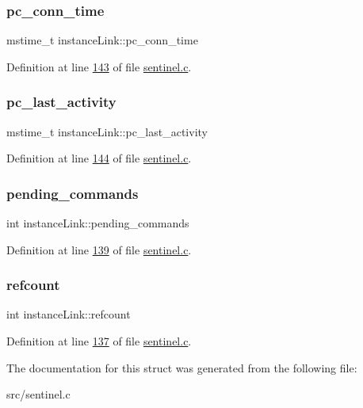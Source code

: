 \subsubsection{\texorpdfstring{pc\+\_\+conn\+\_\+time}{pc\_conn\_time}}
{\footnotesize\ttfamily mstime\+\_\+t instance\+Link\+::pc\+\_\+conn\+\_\+time}



Definition at line \hyperlink{sentinel_8c_source_l00143}{143} of file \hyperlink{sentinel_8c_source}{sentinel.\+c}.

\mbox{\label{structinstanceLink_aa259c3baa9b28cf7d9acee9b72eb825a}} 
\subsubsection{\texorpdfstring{pc\+\_\+last\+\_\+activity}{pc\_last\_activity}}
{\footnotesize\ttfamily mstime\+\_\+t instance\+Link\+::pc\+\_\+last\+\_\+activity}



Definition at line \hyperlink{sentinel_8c_source_l00144}{144} of file \hyperlink{sentinel_8c_source}{sentinel.\+c}.

\mbox{\label{structinstanceLink_ac5a4f9887c9879c453df1ac50374a460}} 
\subsubsection{\texorpdfstring{pending\+\_\+commands}{pending\_commands}}
{\footnotesize\ttfamily int instance\+Link\+::pending\+\_\+commands}



Definition at line \hyperlink{sentinel_8c_source_l00139}{139} of file \hyperlink{sentinel_8c_source}{sentinel.\+c}.

\mbox{\label{structinstanceLink_ab99ac61de9d03b388ade326a0d0e4919}} 
\subsubsection{\texorpdfstring{refcount}{refcount}}
{\footnotesize\ttfamily int instance\+Link\+::refcount}



Definition at line \hyperlink{sentinel_8c_source_l00137}{137} of file \hyperlink{sentinel_8c_source}{sentinel.\+c}.



The documentation for this struct was generated from the following file\+:\begin{DoxyCompactItemize}
\item 
src/sentinel.\+c\end{DoxyCompactItemize}
